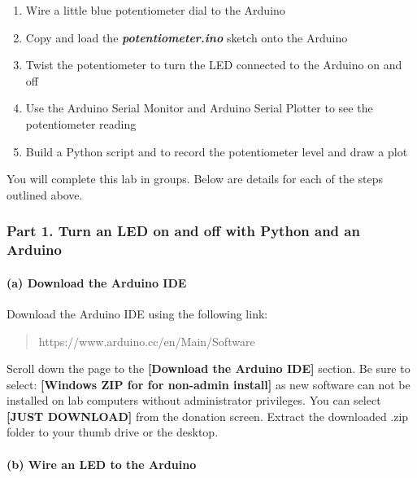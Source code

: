 \documentclass[11pt]{article}
\begin{document}
\begin{enumerate}
\def\labelenumi{(\alph{enumi})}
\item
  Wire a little blue potentiometer dial to the Arduino
\item
  Copy and load the \textbf{\emph{potentiometer.ino}} sketch onto the
  Arduino
\item
  Twist the potentiometer to turn the LED connected to the Arduino on
  and off
\item
  Use the Arduino Serial Monitor and Arduino Serial Plotter to see the
  potentiometer reading
\item
  Build a Python script and to record the potentiometer level and draw a
  plot
\end{enumerate}

    You will complete this lab in groups. Below are details for each of the
steps outlined above.

\hypertarget{part-1.-turn-an-led-on-and-off-with-python-and-an-arduino}{%
\subsubsection{Part 1. Turn an LED on and off with Python and an
Arduino}\label{part-1.-turn-an-led-on-and-off-with-python-and-an-arduino}}

    \hypertarget{a-download-the-arduino-ide}{%
\paragraph{(a) Download the Arduino
IDE}\label{a-download-the-arduino-ide}}

Download the Arduino IDE using the following link:

\begin{quote}
https://www.arduino.cc/en/Main/Software
\end{quote}

Scroll down the page to the \textbf{{[}Download the Arduino IDE{]}}
section. Be sure to select: \textbf{{[}Windows ZIP for for non-admin
install{]}} as new software can not be installed on lab computers
without administrator privileges. You can select \textbf{{[}JUST
DOWNLOAD{]}} from the donation screen. Extract the downloaded .zip
folder to your thumb drive or the desktop.

    \hypertarget{b-wire-an-led-to-the-arduino}{%
\paragraph{(b) Wire an LED to the
Arduino}\label{b-wire-an-led-to-the-arduino}}
\end{document}
